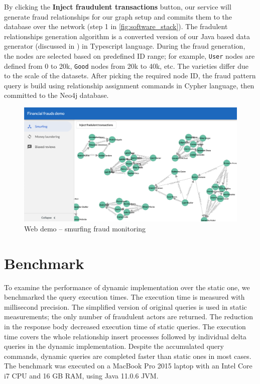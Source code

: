 By clicking the \textbf{Inject fraudulent transactions} button, our service will generate fraud relationships for our graph setup and commits them to the database over the network (step 1 in \autoref{fig:software_stack}).
The fradulent relationships generation algorithm is a converted version of our Java based data generator (discussed in \textbf{}) in Typescript language.
During the fraud generation, the nodes are selected based on predefined ID range; for example, \texttt{User} nodes are defined from 0 to 20k, \texttt{Good} nodes from 20k to 40k, etc. The varieties differ due to the scale of the datasets. 
After picking the required node ID, the fraud pattern query is build using relationship assignment commands in Cypher language, then committed to the Neo4j database.

\begin{figure}[!ht]
  \centering
  \includegraphics[width=\textwidth]{figures/web_demo_smurfing.png}
  \caption{Web demo -- smurfing fraud monitoring} 
  \label{fig:web_demo_smurfing}
\end{figure}

\section{Benchmark}

To examine the performance of dynamic implementation over the static one, we benchmarked the query execution times.
The execution time is measured with millisecond precision.
The simplified version of original queries is used in static measurements; the only number of fraudulent actors are returned.
The reduction in the response body decreased execution time of static queries.
The execution time covers the whole relationship insert processes followed by individual delta queries in the dynamic implementation.
Despite the accumulated query commands, dynamic queries are completed faster than static ones in most cases.
The benchmark was executed on a MacBook Pro 2015 laptop with an Intel Core i7 CPU and 16 GB RAM, using Java 11.0.6 JVM.

